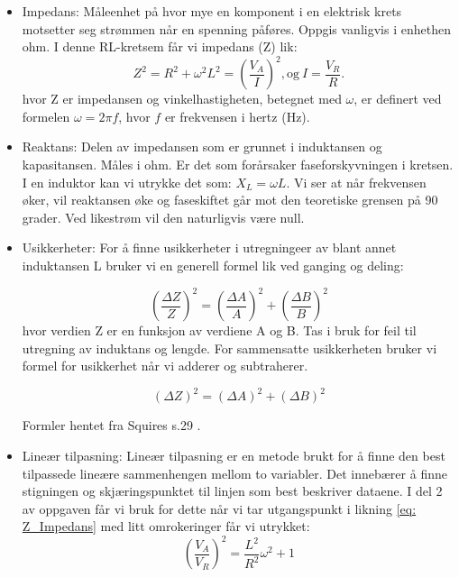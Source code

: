 \documentclass[norsk,a4paper,12pt]{article}
\begin{document}
\begin{itemize}
\item Impedans: Måleenhet på hvor mye en komponent i en elektrisk krets motsetter seg strømmen når en spenning påføres. Oppgis vanligvis i enhethen ohm. I denne RL-kretsem får vi impedans (Z) lik: 
\begin{equation}
Z^2=R^2+\omega^2L^2=\left(\frac{V_A}I\right)^2,\mathrm{og~}I=\frac{V_R}R.
\label{eq: Z_Impedans}
\end{equation}
hvor Z er impedansen og vinkelhastigheten, betegnet med $\omega$, er definert ved formelen $\omega = 2\pi f$, hvor $f$ er frekvensen i hertz (Hz).

\item Reaktans: Delen av impedansen som er grunnet i induktansen og kapasitansen. \cite{snl_reaktans} Måles i ohm. Er det som forårsaker faseforskyvningen i kretsen. I en induktor kan vi utrykke det som:  $X_L=\omega L$. Vi ser at når frekvensen øker, vil reaktansen øke og faseskiftet går mot den teoretiske grensen på 90 grader. Ved likestrøm vil den naturligvis være null. 

\item Usikkerheter: For å finne usikkerheter i utregningeer av blant annet induktansen L bruker vi en generell formel lik ved ganging og deling: 

\begin{equation}
    \left(\frac{\Delta Z}Z\right)^2=\left(\frac{\Delta A}A\right)^2+\left(\frac{\Delta B}B\right)^2
    \label{eq: errorGange}
\end{equation}
hvor verdien Z er en funksjon av verdiene A og B. Tas i bruk for feil til utregning av induktans og lengde. For sammensatte usikkerheten bruker vi formel for usikkerhet når vi adderer og subtraherer.

\begin{equation}
    \left(\Delta Z\right)^2=\left(\Delta A\right)^2+\left(\Delta B\right)^2
    \label{eq: errorPluss}
\end{equation}

Formler hentet fra Squires s.29 \cite{squires1985}.



\item Lineær tilpasning: Lineær tilpasning er en metode brukt for å finne den best tilpassede lineære sammenhengen mellom to variabler. Det innebærer å finne stigningen og skjæringspunktet til linjen som best beskriver dataene. I del 2 av oppgaven får vi bruk for dette når vi tar utgangspunkt i likning \ref{eq: Z_Impedans} med litt omrokeringer får vi utrykket: 
\begin{equation}
\left(\frac{V_A}{V_R}\right)^2=\frac{L^2}{R^2}\omega^2+1
\label{eq: V_a over V_r}
\end{equation}



\end{itemize}
\end{document}
